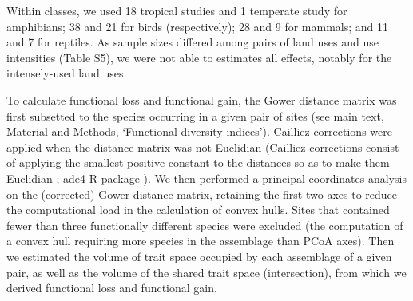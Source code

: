 Within classes, we used 18 tropical studies and 1 temperate study for amphibians; 38 and 21 for birds (respectively); 28 and 9 for mammals; and 11 and 7 for reptiles. As sample sizes differed among pairs of land uses and use intensities (Table S5), we were not able to estimates all effects, notably for the intensely-used land uses. 

To calculate functional loss and functional gain, the Gower distance matrix was first subsetted to the species occurring in a given pair of sites (see main text, Material and Methods, `Functional diversity indices'). Cailliez corrections were applied when the distance matrix was not Euclidian (Cailliez corrections consist of applying the smallest positive constant to the distances so as to make them Euclidian \citep{Cailliez1983}; ade4 R package \citep{ade4package}). We then performed a principal coordinates analysis on the (corrected) Gower distance matrix, retaining the first two axes to reduce the computational load in the calculation of convex hulls. Sites that contained fewer than three functionally different species were excluded (the computation of a convex hull requiring more species in the assemblage than PCoA axes). Then we estimated the volume of trait space occupied by each assemblage of a given pair, as well as the volume of the shared trait space (intersection), from which we derived functional loss and functional gain.


